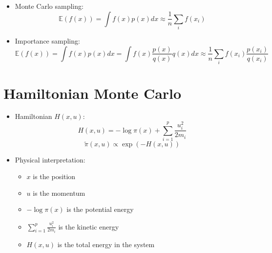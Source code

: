 \documentclass[a4paper]{article}
\begin{document}
\begin{itemize}
    \item Monte Carlo sampling:
    \[\mathbb{E}(f(x))=\int f(x)p(x)dx\approx\frac{1}{n}\sum_i f(x_i) \]
    \item Importance sampling:
    \[\mathbb{E}(f(x))=\int f(x)p(x)dx=\int f(x)\frac{p(x)}{q(x)}q(x)dx\approx\frac{1}{n}\sum_if(x_i)\frac{p(x_i)}{q(x_i)} \]
\end{itemize}

\section*{Hamiltonian Monte Carlo}

\begin{itemize}
    \item Hamiltonian $H(x,u)$:
    \[H(x,u)=-\log\pi(x)+\sum_{i=1}^{p}\frac{u_i^2}{2m_i} \]
    \[\tilde{\pi}(x,u)\propto\exp\left(-H(x,u)\right) \]
    \item Physical interpretation:
    \begin{itemize}
        \item $x$ is the position
        \item $u$ is the momentum
        \item $-\log\pi(x)$ is the potential energy
        \item $\sum_{i=1}^{p}\frac{u_i^2}{2m_i}$ is the kinetic energy
        \item $H(x,u)$ is the total energy in the system
    \end{itemize}
\end{itemize}
\end{document}
